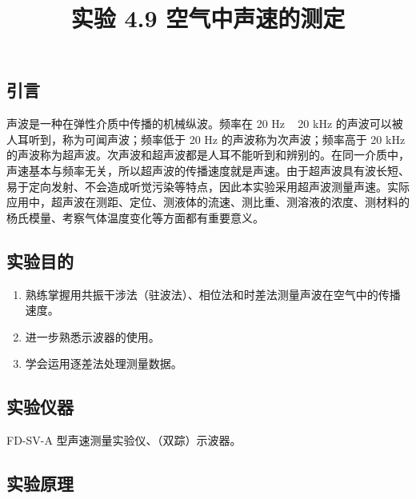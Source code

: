 \documentclass[12pt,a4paper]{article}
\title{实验 4.9 空气中声速的测定}
\author{}
\date{}
\begin{document}
\maketitle

\subsection*{引言}

声波是一种在弹性介质中传播的机械纵波。频率在 20 Hz ~ 20 kHz 的声波可以被人耳听到，称为可闻声波；频率低于 20 Hz 的声波称为次声波；频率高于 20 kHz 的声波称为超声波。次声波和超声波都是人耳不能听到和辨别的。在同一介质中，声速基本与频率无关，所以超声波的传播速度就是声速。由于超声波具有波长短、易于定向发射、不会造成听觉污染等特点，因此本实验采用超声波测量声速。实际应用中，超声波在测距、定位、测液体的流速、测比重、测溶液的浓度、测材料的杨氏模量、考察气体温度变化等方面都有重要意义。

\subsection*{实验目的}

\begin{enumerate}
\item 熟练掌握用共振干涉法（驻波法）、相位法和时差法测量声波在空气中的传播速度。
\item 进一步熟悉示波器的使用。
\item 学会运用逐差法处理测量数据。
\end{enumerate}

\subsection*{实验仪器}

FD-SV-A 型声速测量实验仪、（双踪）示波器。

\subsection*{实验原理}
\end{document}
